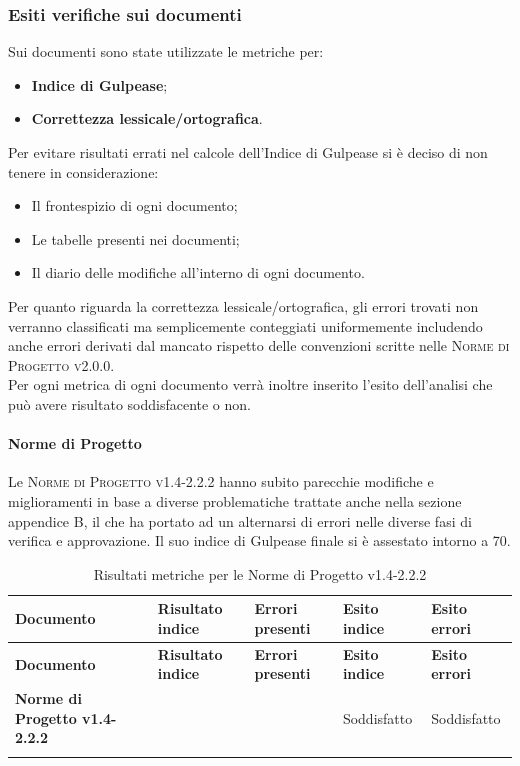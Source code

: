 \documentclass[../piano-di-qualifica.tex]{subfiles}
\begin{document}
\subsubsection{Esiti verifiche sui documenti}
\label{sub:esiti_verifiche_sui_documenti}
Sui documenti sono state utilizzate le metriche per:
    \begin{itemize}
        \item \textbf{Indice di Gulpease};
        \item \textbf{Correttezza lessicale/ortografica}.
    \end{itemize}
Per evitare risultati errati nel calcole dell'Indice di Gulpease si è deciso di non tenere in considerazione:
    \begin{itemize}
        \item Il frontespizio di ogni documento;
        \item Le tabelle presenti nei documenti;
        \item Il diario delle modifiche all'interno di ogni documento.
    \end{itemize}
Per quanto riguarda la correttezza lessicale/ortografica, gli errori trovati non verranno classificati ma semplicemente conteggiati uniformemente includendo anche errori derivati dal mancato rispetto delle convenzioni scritte nelle \textsc{Norme di Progetto v2.0.0}.
\\ Per ogni metrica di ogni documento verrà inoltre inserito l'esito dell'analisi che può avere risultato soddisfacente o non.

\paragraph{Norme di Progetto}
\label{sub:norme_di_progetto}
Le \textsc{Norme di Progetto v1.4-2.2.2} hanno subito parecchie modifiche e miglioramenti in base a diverse problematiche trattate anche nella sezione appendice B, il che ha portato ad un alternarsi di errori nelle diverse fasi di verifica e approvazione.
Il suo indice di Gulpease finale si è assestato intorno a 70.

\renewcommand{\arraystretch}{2} %
\begin{longtable}[H]{>{\centering\bfseries}m{6cm} >{\centering}m{2cm} >{\centering}m{2.5cm} >{\centering}m{2.5cm} >{\centering\arraybackslash}m{2.5cm}}  
  \rowcolor{lightgray}
  {\textbf{Documento}} & {\textbf{Risultato indice}} & {\textbf{Errori presenti}} & {\textbf{Esito indice}} & {\textbf{Esito errori}}  \\
  \endfirsthead%
  \rowcolor{lightgray}
  {\textbf{Documento}} & {\textbf{Risultato indice}} & {\textbf{Errori presenti}} & {\textbf{Esito indice}} & {\textbf{Esito errori}}  \\
  \endhead%
  \textbf{Norme di Progetto v1.4-2.2.2} & 70                 & 0               & Soddisfatto & Soddisfatto \\
  \caption{Risultati metriche per le Norme di Progetto v1.4-2.2.2}
  \label{tab:my-table}
\end{longtable}
\end{document}
